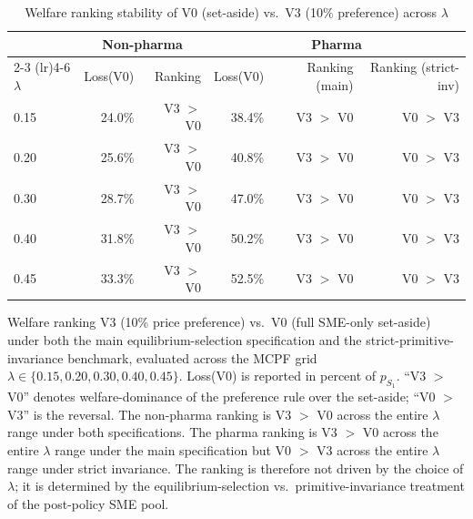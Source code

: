 \begin{table}[htbp]
\centering
\begin{threeparttable}
\caption{Welfare ranking stability of V0 (set-aside) vs.\ V3 (10\% preference) across $\lambda$}
\label{tab:welfare_ranking_lambda}
\footnotesize
\setlength{\tabcolsep}{4pt}
\begin{tabular}{lrrrrr}
\toprule
 & \multicolumn{2}{c}{Non-pharma} & \multicolumn{3}{c}{Pharma} \\
\cmidrule(lr){2-3} \cmidrule(lr){4-6}
$\lambda$ & Loss(V0) & Ranking & Loss(V0) & Ranking (main) & Ranking (strict-inv) \\
\midrule
0.15 & 24.0\% & V3 $>$ V0 & 38.4\% & V3 $>$ V0 & V0 $>$ V3 \\
0.20 & 25.6\% & V3 $>$ V0 & 40.8\% & V3 $>$ V0 & V0 $>$ V3 \\
0.30 & 28.7\% & V3 $>$ V0 & 47.0\% & V3 $>$ V0 & V0 $>$ V3 \\
0.40 & 31.8\% & V3 $>$ V0 & 50.2\% & V3 $>$ V0 & V0 $>$ V3 \\
0.45 & 33.3\% & V3 $>$ V0 & 52.5\% & V3 $>$ V0 & V0 $>$ V3 \\
\bottomrule
\end{tabular}
\begin{tablenotes}\footnotesize
\item Welfare ranking V3 (10\% price preference) vs.\ V0 (full SME-only set-aside)
under both the main equilibrium-selection specification and the strict-primitive-invariance
benchmark, evaluated across the MCPF grid $\lambda \in \{0.15, 0.20, 0.30, 0.40, 0.45\}$.
Loss(V0) is reported in percent of $p_{S_1}$. ``V3 $>$ V0'' denotes welfare-dominance
of the preference rule over the set-aside; ``V0 $>$ V3'' is the reversal. The
non-pharma ranking is V3 $>$ V0 across the entire $\lambda$ range under both
specifications. The pharma ranking is V3 $>$ V0 across the entire $\lambda$ range
under the main specification but V0 $>$ V3 across the entire $\lambda$ range under
strict invariance. The ranking is therefore not driven by the choice of $\lambda$;
it is determined by the equilibrium-selection vs.\ primitive-invariance treatment
of the post-policy SME pool.
\end{tablenotes}
\end{threeparttable}
\end{table}

